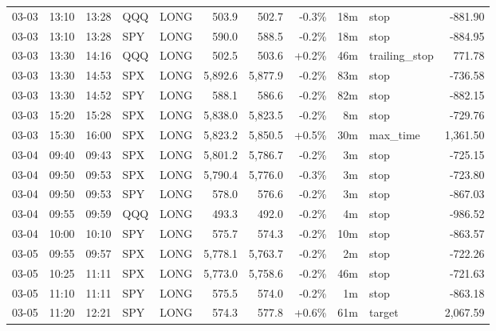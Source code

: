 \documentclass[11pt,a4paper,twoside]{article}
\begin{document}
\begin{center}
\begin{longtable}{>{\color{txtmain}}l l l l l r r r r >{\color{txtmain}}l r}
03-03 & 13:10 & 13:28 & QQQ & LONG & 503.9 & 502.7 & \textcolor{lossred}{-0.3\%} & 18m & stop & \textcolor{lossred}{-881.90} \\
03-03 & 13:10 & 13:28 & SPY & LONG & 590.0 & 588.5 & \textcolor{lossred}{-0.2\%} & 18m & stop & \textcolor{lossred}{-884.95} \\
03-03 & 13:30 & 14:16 & QQQ & LONG & 502.5 & 503.6 & \textcolor{wingreen}{+0.2\%} & 46m & trailing\_stop & \textcolor{wingreen}{771.78} \\
03-03 & 13:30 & 14:53 & SPX & LONG & 5,892.6 & 5,877.9 & \textcolor{lossred}{-0.2\%} & 83m & stop & \textcolor{lossred}{-736.58} \\
03-03 & 13:30 & 14:52 & SPY & LONG & 588.1 & 586.6 & \textcolor{lossred}{-0.2\%} & 82m & stop & \textcolor{lossred}{-882.15} \\
03-03 & 15:20 & 15:28 & SPX & LONG & 5,838.0 & 5,823.5 & \textcolor{lossred}{-0.2\%} & 8m & stop & \textcolor{lossred}{-729.76} \\
03-03 & 15:30 & 16:00 & SPX & LONG & 5,823.2 & 5,850.5 & \textcolor{wingreen}{+0.5\%} & 30m & max\_time & \textcolor{wingreen}{1,361.50} \\
03-04 & 09:40 & 09:43 & SPX & LONG & 5,801.2 & 5,786.7 & \textcolor{lossred}{-0.2\%} & 3m & stop & \textcolor{lossred}{-725.15} \\
03-04 & 09:50 & 09:53 & SPX & LONG & 5,790.4 & 5,776.0 & \textcolor{lossred}{-0.3\%} & 3m & stop & \textcolor{lossred}{-723.80} \\
03-04 & 09:50 & 09:53 & SPY & LONG & 578.0 & 576.6 & \textcolor{lossred}{-0.2\%} & 3m & stop & \textcolor{lossred}{-867.03} \\
03-04 & 09:55 & 09:59 & QQQ & LONG & 493.3 & 492.0 & \textcolor{lossred}{-0.2\%} & 4m & stop & \textcolor{lossred}{-986.52} \\
03-04 & 10:00 & 10:10 & SPY & LONG & 575.7 & 574.3 & \textcolor{lossred}{-0.2\%} & 10m & stop & \textcolor{lossred}{-863.57} \\
03-05 & 09:55 & 09:57 & SPX & LONG & 5,778.1 & 5,763.7 & \textcolor{lossred}{-0.2\%} & 2m & stop & \textcolor{lossred}{-722.26} \\
03-05 & 10:25 & 11:11 & SPX & LONG & 5,773.0 & 5,758.6 & \textcolor{lossred}{-0.2\%} & 46m & stop & \textcolor{lossred}{-721.63} \\
03-05 & 11:10 & 11:11 & SPY & LONG & 575.5 & 574.0 & \textcolor{lossred}{-0.2\%} & 1m & stop & \textcolor{lossred}{-863.18} \\
03-05 & 11:20 & 12:21 & SPY & LONG & 574.3 & 577.8 & \textcolor{wingreen}{+0.6\%} & 61m & target & \textcolor{wingreen}{2,067.59} \\

\end{longtable}
\end{center}
\end{document}
